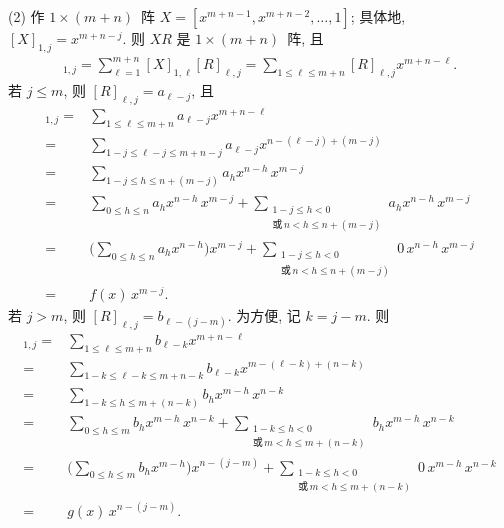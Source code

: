 \begin{example}
    (2)
    作 \(1 \times (m + n)\)~阵
    \(X = [x^{m+n-1}, x^{m+n-2}, \dots, 1]\);
    具体地,
    \([X]_{1,j} = x^{m+n-j}\).
    则 \(XR\) 是 \(1 \times (m + n)\)~阵,
    且
    \begin{align*}
        [XR]_{1,j}
        =
        \sum_{\ell = 1}^{m+n}
        {[X]_{1,\ell} [R]_{\ell,j}}
        =
        \sum_{1 \leq \ell \leq m+n}
        {[R]_{\ell,j} x^{m+n-\ell}}.
    \end{align*}
    若 \(j \leq m\), 则 \([R]_{\ell,j} = a_{\ell-j}\), 且
    \begin{align*}
        [XR]_{1,j}
        = {} &
        \sum_{1 \leq \ell \leq m+n}
        {a_{\ell-j} x^{m+n-\ell}}
        \\
        = {} &
        \sum_{1-j \leq \ell-j \leq m+n-j}
        {a_{\ell-j} x^{n-(\ell-j)+(m-j)}}
        \\
        = {} &
        \sum_{1-j \leq h \leq n+(m-j)}
        {a_h x^{n-h}\, x^{m-j}}
        \\
        = {} &
        \sum_{0 \leq h \leq n}
        {a_h x^{n-h}\, x^{m-j}}
        +
        \sum_{\substack{
        1-j \leq h < 0 \\
                \text{或}\, n < h \leq n+(m-j)
            }}
        {a_h x^{n-h}\, x^{m-j}}
        \\
        = {} &
        \Bigg( \sum_{0 \leq h \leq n}
        {a_h x^{n-h}} \Bigg) x^{m-j}
        +
        \sum_{\substack{
        1-j \leq h < 0 \\
                \text{或}\, n < h \leq n+(m-j)
            }}
        {0\, x^{n-h}\, x^{m-j}}
        \\
        = {} &
        f(x)\, x^{m-j}.
    \end{align*}
    若 \(j > m\), 则 \([R]_{\ell,j} = b_{\ell-(j-m)}\).
    为方便, 记 \(k = j - m\).
    则
    \begin{align*}
        [XR]_{1,j}
        = {} &
        \sum_{1 \leq \ell \leq m+n}
        {b_{\ell-k} x^{m+n-\ell}}
        \\
        = {} &
        \sum_{1-k \leq \ell-k \leq m+n-k}
        {b_{\ell-k} x^{m-(\ell-k)+(n-k)}}
        \\
        = {} &
        \sum_{1-k \leq h \leq m+(n-k)}
        {b_h x^{m-h}\, x^{n-k}}
        \\
        = {} &
        \sum_{0 \leq h \leq m}
        {b_h x^{m-h}\, x^{n-k}}
        +
        \sum_{\substack{
        1-k \leq h < 0 \\
                \text{或}\, m < h \leq m+(n-k)
            }}
        {b_h x^{m-h}\, x^{n-k}}
        \\
        = {} &
        \Bigg( \sum_{0 \leq h \leq m}
        {b_h x^{m-h}} \Bigg) x^{n-(j-m)}
        +
        \sum_{\substack{
        1-k \leq h < 0 \\
                \text{或}\, m < h \leq m+(n-k)
            }}
        {0\, x^{m-h}\, x^{n-k}}
        \\
        = {} &
        g(x)\, x^{n-(j-m)}.
    \end{align*}


\end{example}
